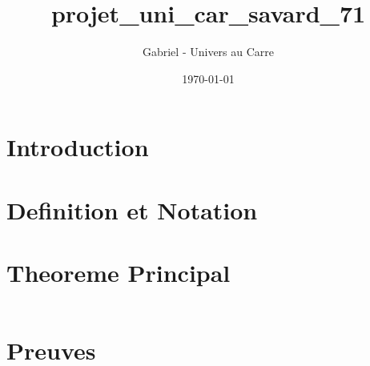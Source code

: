 \documentclass[12pt]{article}
\title{projet_uni_car_savard_71}
\author{Gabriel - Univers au Carre}
\date{\today}
\begin{document}
\maketitle


\section{Introduction}



\section{Definition et Notation}



\section{Theoreme Principal}


\begin{equation}
\end{equation}


\section{Preuves}


\end{document}
